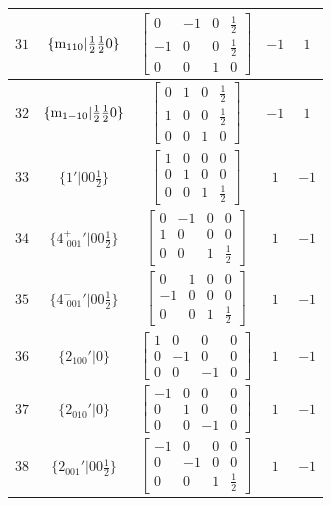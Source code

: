 \documentclass[fleqn,8pt]{jsarticle}
\begin{document}
\begin{longtable}{ccccc}
$ 31 $ & $ \{{\rm m}_{110}|\frac{1}{2} \frac{1}{2} 0\} $ & $ \begin{bmatrix} 0 & -1 & 0 & \frac{1}{2} \\ -1 & 0 & 0 & \frac{1}{2} \\ 0 & 0 & 1 & 0 \end{bmatrix} $ & $ -1 $ & $ 1 $ \\ \hline
$ 32 $ & $ \{{\rm m}_{1-10}|\frac{1}{2} \frac{1}{2} 0\} $ & $ \begin{bmatrix} 0 & 1 & 0 & \frac{1}{2} \\ 1 & 0 & 0 & \frac{1}{2} \\ 0 & 0 & 1 & 0 \end{bmatrix} $ & $ -1 $ & $ 1 $ \\ \hline
$ 33 $ & $ \{1{}'|0 0 \frac{1}{2}\} $ & $ \begin{bmatrix} 1 & 0 & 0 & 0 \\ 0 & 1 & 0 & 0 \\ 0 & 0 & 1 & \frac{1}{2} \end{bmatrix} $ & $ 1 $ & $ -1 $ \\ \hline
$ 34 $ & $ \{4^{+}_{\,\,001}{}'|0 0 \frac{1}{2}\} $ & $ \begin{bmatrix} 0 & -1 & 0 & 0 \\ 1 & 0 & 0 & 0 \\ 0 & 0 & 1 & \frac{1}{2} \end{bmatrix} $ & $ 1 $ & $ -1 $ \\ \hline
$ 35 $ & $ \{4^{-}_{\,\,001}{}'|0 0 \frac{1}{2}\} $ & $ \begin{bmatrix} 0 & 1 & 0 & 0 \\ -1 & 0 & 0 & 0 \\ 0 & 0 & 1 & \frac{1}{2} \end{bmatrix} $ & $ 1 $ & $ -1 $ \\ \hline
$ 36 $ & $ \{2{}_{100}{}'|0\} $ & $ \begin{bmatrix} 1 & 0 & 0 & 0 \\ 0 & -1 & 0 & 0 \\ 0 & 0 & -1 & 0 \end{bmatrix} $ & $ 1 $ & $ -1 $ \\ \hline
$ 37 $ & $ \{2{}_{010}{}'|0\} $ & $ \begin{bmatrix} -1 & 0 & 0 & 0 \\ 0 & 1 & 0 & 0 \\ 0 & 0 & -1 & 0 \end{bmatrix} $ & $ 1 $ & $ -1 $ \\ \hline
$ 38 $ & $ \{2{}_{001}{}'|0 0 \frac{1}{2}\} $ & $ \begin{bmatrix} -1 & 0 & 0 & 0 \\ 0 & -1 & 0 & 0 \\ 0 & 0 & 1 & \frac{1}{2} \end{bmatrix} $ & $ 1 $ & $ -1 $ \\ \hline

\end{longtable}
\end{document}
